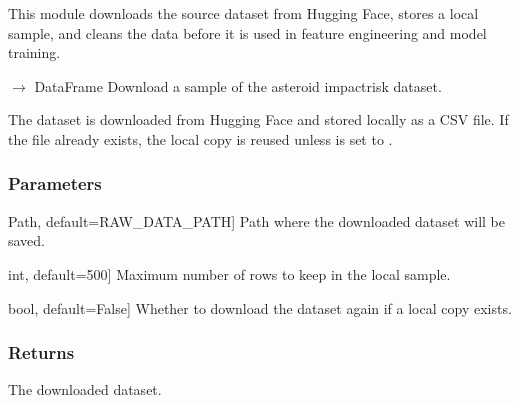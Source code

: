 \documentclass[letterpaper,10pt,english]{sphinxmanual}
\begin{document}
\sphinxAtStartPar
This module downloads the source dataset from Hugging Face, stores a local
sample, and cleans the data before it is used in feature engineering and model
training.

\begin{fulllineitems}
\label{\detokenize{modules:asteroid_impact.features.download_dataset}}
\pysigstartsignatures
\pysiglinewithargsret
{}
{\sphinxparamcomma {}\sphinxparamcomma {}}
{{ $\rightarrow$ DataFrame}}
\pysigstopsignatures
\sphinxAtStartPar
Download a sample of the asteroid impact\sphinxhyphen{}risk dataset.

\sphinxAtStartPar
The dataset is downloaded from Hugging Face and stored locally as a CSV
file. If the file already exists, the local copy is reused unless
 is set to .


\subsubsection{Parameters}
\label{\detokenize{modules:id3}}\begin{description}
\sphinxlineitem{output\_path}{[}Path, default=RAW\_DATA\_PATH{]}
\sphinxAtStartPar
Path where the downloaded dataset will be saved.

\sphinxlineitem{sample\_size}{[}int, default=500{]}
\sphinxAtStartPar
Maximum number of rows to keep in the local sample.

\sphinxlineitem{force\_download}{[}bool, default=False{]}
\sphinxAtStartPar
Whether to download the dataset again if a local copy exists.

\end{description}


\subsubsection{Returns}
\label{\detokenize{modules:id4}}\begin{description}
\sphinxAtStartPar
The downloaded dataset.

\end{description}

\end{fulllineitems}
\end{document}
